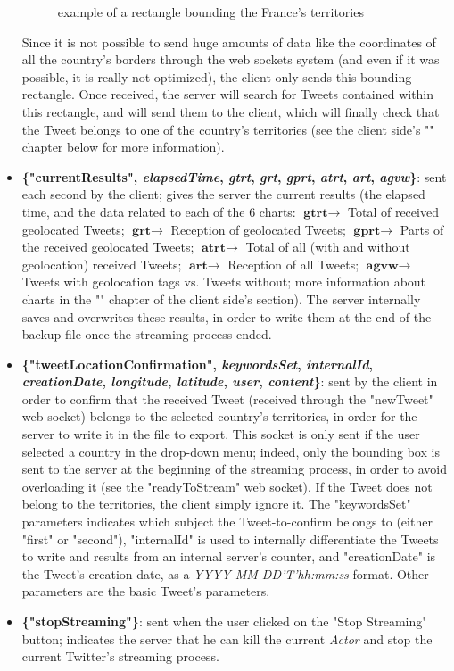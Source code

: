 \documentclass[a4paper,11pt]{report}
\begin{document}
\begin{itemize}
\begin{figure}[H]
\begin{center}
	\vspace{-5pt}
	\caption{example of a rectangle bounding the France's territories}
	\end{center}
	\end{figure}
	\vspace{-20pt}
	
	Since it is not possible to send huge amounts of data like the coordinates of all the country's borders through the web sockets system (and even if it was possible, it is really not optimized), the client only sends this bounding rectangle. Once received, the server will search for Tweets contained within this rectangle, and will send them to the client, which will finally check that the Tweet belongs to one of the country's territories (see the client side's "" chapter below for more information).
	
	\item \textbf{\{"currentResults", \textit{elapsedTime}, \textit{gtrt}, \textit{grt}, \textit{gprt}, \textit{atrt}, \textit{art}, \textit{agvw}\}}: sent each second by the client; gives the server the current results (the elapsed time, and the data related to each of the 6 charts: $\textbf{gtrt}\to$ Total of received geolocated Tweets; $\textbf{grt}\to$ Reception of geolocated Tweets; $\textbf{gprt}\to$ Parts of the received geolocated Tweets; $\textbf{atrt}\to$ Total of all (with and without geolocation) received Tweets; $\textbf{art}\to$ Reception of all Tweets; $\textbf{agvw}\to$ Tweets with geolocation tags vs. Tweets without; more information about charts in the "" chapter of the client side's section). The server internally saves and overwrites these results, in order to write them at the end of the backup file once the streaming process ended.
	\newpage
	\item \textbf{\{"tweetLocationConfirmation", \textit{keywordsSet}, \textit{internalId}, \textit{creationDate}, \textit{longitude}, \textit{latitude}, \textit{user}, \textit{content}\}}: sent by the client in order to confirm that the received Tweet (received through the "newTweet" web socket) belongs to the selected country's territories, in order for the server to write it in the file to export. This socket is only sent if the user selected a country in the drop-down menu; indeed, only the bounding box is sent to the server at the beginning of the streaming process, in order to avoid overloading it (see the "readyToStream" web socket). If the Tweet does not belong to the territories, the client simply ignore it. The "keywordsSet" parameters indicates which subject the Tweet-to-confirm belongs to (either "first" or "second"), "internalId" is used to internally differentiate the Tweets to write and results from an internal server's counter, and "creationDate" is the Tweet's creation date, as a \emph{YYYY-MM-DD'T'hh:mm:ss} format. Other parameters are the basic Tweet's parameters.
	\item \textbf{\{"stopStreaming"\}}: sent when the user clicked on the "Stop Streaming" button; indicates the server that he can kill the current \emph{Actor} and stop the current Twitter's streaming process.
\end{itemize}
\newpage
\end{document}

